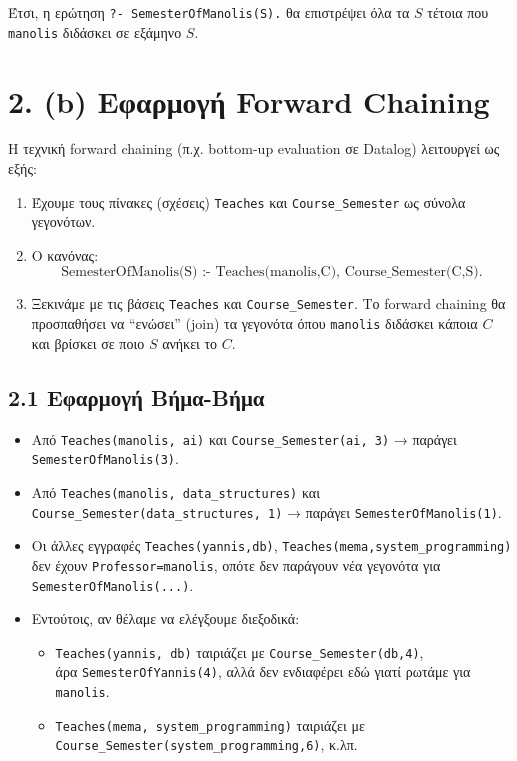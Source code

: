 \documentclass[a4paper,12pt]{article}
\begin{document}
Έτσι, η ερώτηση \texttt{?- SemesterOfManolis(S).} θα επιστρέψει όλα τα $S$ τέτοια που \texttt{manolis} διδάσκει σε εξάμηνο $S$.

\section*{2. (b) Εφαρμογή Forward Chaining}

Η τεχνική forward chaining (π.χ. bottom-up evaluation σε Datalog) λειτουργεί ως εξής:
\begin{enumerate}
    \item Έχουμε τους πίνακες (σχέσεις) \texttt{Teaches} και \texttt{Course\_Semester} ως σύνολα γεγονότων.
    \item Ο κανόνας:
    \[
    \text{SemesterOfManolis(S) :- Teaches(manolis,C), Course\_Semester(C,S).}
    \]
    \item Ξεκινάμε με τις βάσεις \texttt{Teaches} και \texttt{Course\_Semester}. Το forward chaining θα προσπαθήσει να “ενώσει” (join) τα γεγονότα όπου \texttt{manolis} διδάσκει κάποια $C$ και βρίσκει σε ποιο $S$ ανήκει το $C$.
\end{enumerate}

\subsection*{2.1 Εφαρμογή Βήμα-Βήμα}

\begin{itemize}
    \item Από \texttt{Teaches(manolis, ai)} και \texttt{Course\_Semester(ai, 3)} → παράγει 
    \\ \texttt{SemesterOfManolis(3)}.
    \item Από \texttt{Teaches(manolis, data\_structures)} και \texttt{Course\_Semester(data\_structures, 1)} → παράγει \texttt{SemesterOfManolis(1)}.
    \item Οι άλλες εγγραφές \texttt{Teaches(yannis,db)}, \texttt{Teaches(mema,system\_programming)} δεν έχουν \texttt{Professor=manolis}, οπότε δεν παράγουν νέα γεγονότα για 
    \\ \texttt{SemesterOfManolis(...)}.
    \item Εντούτοις, αν θέλαμε να ελέγξουμε διεξοδικά: 
    \begin{itemize}
        \item \texttt{Teaches(yannis, db)} ταιριάζει με \texttt{Course\_Semester(db,4)}, 
        \\ άρα \texttt{SemesterOfYannis(4)}, αλλά δεν ενδιαφέρει εδώ γιατί ρωτάμε για \texttt{manolis}.
        \item \texttt{Teaches(mema, system\_programming)} ταιριάζει με 
       \\ \texttt{Course\_Semester(system\_programming,6)}, κ.λπ.
    \end{itemize}
\end{itemize}
\end{document}

